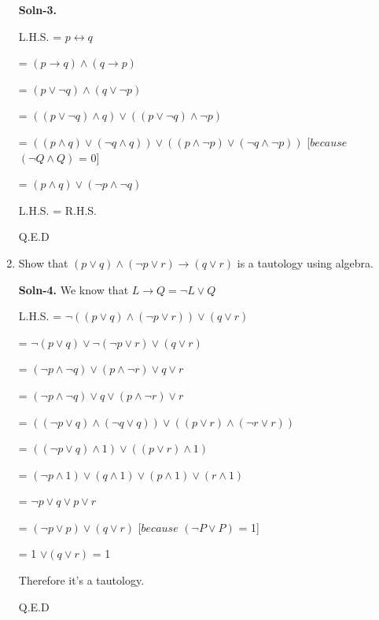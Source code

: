 \documentclass{article}
\begin{document}
\begin{enumerate}
        \textbf{Soln-3.}\par
        L.H.S. = $p \leftrightarrow q$\par
           = $(p \rightarrow q) \wedge (q \rightarrow p)$\par
           = $(p \vee \neg q) \wedge (q \vee \neg p)$\par
           = $((p \vee \neg q) \wedge q) \vee ((p \vee \neg q) \wedge \neg p)$\par
           = $((p \wedge q) \vee (\neg q \wedge q)) \vee ((p \wedge \neg p) \vee (\neg q \wedge \neg p))$ [$ because $  $(\neg Q \wedge Q)$ = 0] \par		
           = $(p \wedge q) \vee (\neg p \wedge \neg q)$\par
        L.H.S. = R.H.S.\par
        \begin{center}
        Q.E.D
        \end{center}
        
\item   Show that $(p \vee q) \wedge (\neg p \vee r) \rightarrow (q \vee r)$
        is a tautology using algebra.

        \textbf{Soln-4.} We know that $L \rightarrow Q  = \neg L \vee Q$ \par
        L.H.S. = $\neg ((p \vee q) \wedge (\neg p \vee r)) \vee (q \vee r)$\par
           = $\neg (p \vee q) \vee \neg (\neg p \vee r) \vee (q \vee r)$ \par
           = $(\neg p \wedge \neg q) \vee (p \wedge \neg r) \vee q \vee r $ \par
           = $(\neg p \wedge \neg q) \vee q \vee (p \wedge \neg r) \vee r$\par
           = $((\neg p \vee q) \wedge (\neg q \vee q)) \vee ((p \vee r) \wedge (\neg r \vee r))$\par
           = $((\neg p \vee q) \wedge 1) \vee ((p \vee r) \wedge 1)$\par
           = $(\neg p \wedge 1) \vee (q \wedge 1) \vee (p \wedge 1) \vee (r \wedge 1)$\par
           = $\neg p \vee q \vee p \vee r$\par
           = $(\neg p \vee p) \vee (q \vee r)$ [$ because $  $(\neg P \vee P)$ = 1] \par
           = 1 $\vee (q \vee r)$
           = 1 	
         
        Therefore it's a tautology.\par
        \begin{center}
        Q.E.D
        \end{center}


\end{enumerate}
\end{document}
